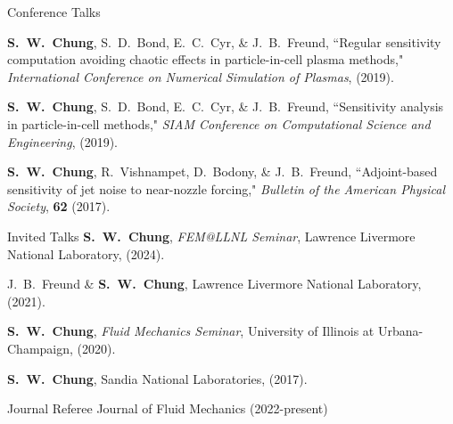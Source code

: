 \documentclass{resume} %
\begin{document}
\begin{rSection}{Conference Talks}
\par
\textbf{S.\ W.\ Chung}, S.\ D.\ Bond, E.\ C.\ Cyr, \& J.\ B.\ Freund,
``Regular sensitivity computation avoiding chaotic effects in particle-in-cell plasma methods,"
\textit{International Conference on Numerical Simulation of Plasmas}, (2019).

\par
\textbf{S.\ W.\ Chung}, S.\ D.\ Bond, E.\ C.\ Cyr, \& J.\ B.\ Freund, ``Sensitivity analysis in particle-in-cell methods,"
\textit{SIAM Conference on Computational Science and Engineering}, (2019).

\par
\textbf{S.\ W.\ Chung}, R.\ Vishnampet, D.\ Bodony, \& J.\ B.\ Freund, ``Adjoint-based sensitivity of jet noise to near-nozzle forcing,"
\textit{Bulletin of the American Physical Society}, \textbf{62} (2017).
\end{rSection}

\clearpage
\begin{rSection}{Invited Talks}
\textbf{S.\ W.\ Chung}, \textit{FEM@LLNL Seminar}, Lawrence Livermore National Laboratory, (2024).
\par
J.\ B.\ Freund \& \textbf{S.\ W.\ Chung}, Lawrence Livermore National Laboratory, (2021).
\par
\textbf{S.\ W.\ Chung}, \textit{Fluid Mechanics Seminar}, University of Illinois at Urbana-Champaign, (2020).
\par
\textbf{S.\ W.\ Chung}, Sandia National Laboratories, (2017).
\end{rSection}

\begin{rSection}{Journal Referee}
Journal of Fluid Mechanics (2022-present)
\end{rSection}

\end{document}
